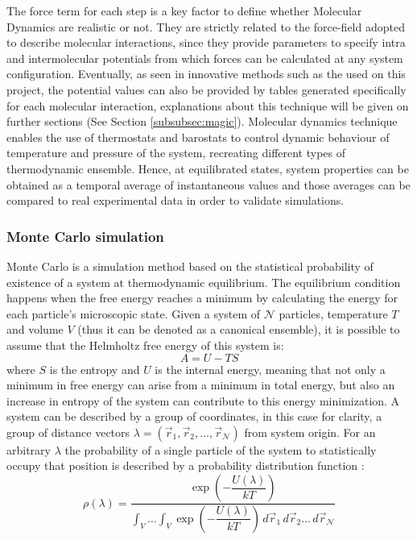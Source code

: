 \documentclass[10pt,a4paper,twoside]{article}
\begin{document}
The force term for each step is a key factor to define whether Molecular Dynamics are realistic or not. They are strictly related to the force-field adopted to describe molecular interactions, since they provide parameters to specify intra and intermolecular potentials from which forces can be calculated at any system configuration. Eventually, as seen in innovative methods such as the used on this project, the potential values can also be provided by tables generated specifically for each molecular interaction, explanations about this technique will be given on further sections (See Section \ref{subsubsec:magic}). Molecular dynamics technique enables the use of thermostats and barostats to control dynamic behaviour of temperature and pressure of the system, recreating different types of thermodynamic ensemble. Hence, at equilibrated states, system properties can be obtained as a temporal average of instantaneous values and those averages can be compared to real experimental data in order to validate simulations.

\subsubsection{Monte Carlo simulation}
Monte Carlo is  a simulation method based on the statistical probability of existence of a system at thermodynamic equilibrium. The equilibrium condition happens when the free energy reaches a minimum by calculating the energy for each particle's microscopic state. Given a system of $ \mathcal{N}$ particles, temperature $T$ and volume $V$ (thus it can be denoted as a canonical ensemble), it is possible to assume that  the Helmholtz free energy of this system is:
\begin{equation}
A = U - TS
\label{eqn:freeE}
\end{equation}
where $S$ is the entropy and $U$ is the internal energy, meaning that not only a minimum in free energy can arise from a minimum in total energy, but also an increase in entropy of the system can contribute to this energy minimization. A system can be described by a group of coordinates, in this case for clarity, a group of distance vectors $\lambda = (	\vec{r}_1,\vec{r}_2, \ldots, \vec{r}_\mathcal{N} )$ from system origin. For an arbitrary $\lambda$ the probability of a single particle of the system to statistically occupy that position is described by a probability distribution function \cite{satoh}:
\begin{equation}
\rho(\lambda) = \dfrac{\exp{\left(-\dfrac{U(\lambda)}{kT}\right)}}{\displaystyle \int_V \dots   \int_V \exp{\left(-\dfrac{U(\lambda)}{kT}\right)}\,d\vec{r}_1 \,d\vec{r}_2 \ldots \,d\vec{r}_\mathcal{N} }
\label{eqn:rho}
\end{equation}
\end{document}
